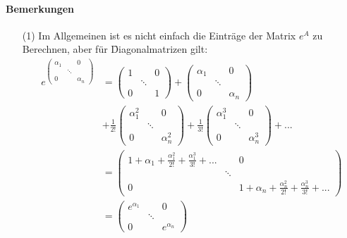 \paragraph{Bemerkungen}
\begin{itemize}
\item[(1)] Im Allgemeinen ist es nicht einfach die Einträge der Matrix $e^A$ zu Berechnen, aber für \f{Diagonalmatrizen} gilt:
\begin{align}
e^{\begin{pmatrix} \alpha_1 & & 0 \\ & \ddots & \\ 0 & & \alpha_n \end{pmatrix}} &= \begin{pmatrix} 1 & & 0 \\ & \ddots & \\ 0 & & 1 \end{pmatrix} + \begin{pmatrix} \alpha_1 & & 0 \\ & \ddots & \\ 0 & & \alpha_n \end{pmatrix} \\ 
&+ \frac{1}{2!} \begin{pmatrix} \alpha_1^{2} & & 0 \\ & \ddots & \\ 0 & & \alpha_{n}^{2} \end{pmatrix} + \frac{1}{3!} \begin{pmatrix} \alpha_1^{3} & & 0 \\ & \ddots & \\ 0 & & \alpha_n^{3} \end{pmatrix} + ... \\
&= \begin{pmatrix} 1 + \alpha_1 + \frac{\alpha_1^{2}}{2!} + \frac{\alpha_1^{3}}{3!} + ... & & 0 \\ & \ddots & \\ 0 & & 1 + \alpha_n + \frac{\alpha_n^{2}}{2!} + \frac{\alpha_n^{3}}{3!} + ... \end{pmatrix} \\
&= \begin{pmatrix} e^{\alpha_1} & & 0 \\ & \ddots & \\ 0 & & e^{\alpha_n} \end{pmatrix}
\end{align}


\end{itemize}
